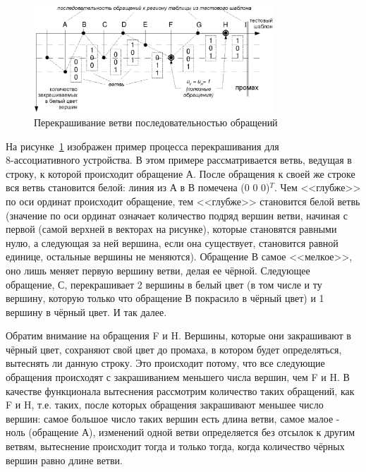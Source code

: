   \begin{figure}[h] \center
  \includegraphics[width=0.8\textwidth]{2.theor/plru_usefl_exmp}
  \caption{Перекрашивание ветви последовательностью обращений}\label{fig:plru_exmp_vytesn}
  \end{figure}

На рисунке~\ref{fig:plru_exmp_vytesn} изображен пример процесса перекрашивания для \\8-ассоциативного устройства. В этом примере рассматривается ветвь, ведущая в строку, к которой происходит обращение А. После обращения к своей же строке вся ветвь становится белой: линия из А в В помечена (0 0 0)$^T$. Чем <<глубже>> по оси ординат происходит обращение, тем <<глубже>> становится белой ветвь (значение по оси ординат означает количество подряд вершин ветви, начиная с первой (самой верхней в векторах на рисунке), которые становятся равными нулю, а следующая за ней вершина, если она существует, становится равной единице, остальные вершины не меняются). Обращение В самое <<мелкое>>, оно лишь меняет первую вершину ветви, делая ее чёрной. Следующее обращение, С, перекрашивает 2 вершины в белый цвет (в том числе и ту вершину, которую только что обращение В покрасило в чёрный цвет) и 1 вершину в чёрный цвет. И так далее.

Обратим внимание на обращения F и H. Вершины, которые они закрашивают в чёрный цвет, сохраняют свой цвет до промаха, в котором будет определяться, вытеснять ли данную строку. Это происходит потому, что все следующие обращения происходят с закрашиванием меньшего числа вершин, чем F и H. В качестве функционала вытеснения рассмотрим количество таких обращений, как F и H, т.е. таких, после которых обращения закрашивают меньшее число вершин: самое большое число таких вершин есть длина ветви, самое малое - ноль (обращение А), изменений одной ветви определяется без отсылок к другим ветвям, вытеснение происходит тогда и только тогда, когда количество чёрных вершин равно длине ветви.

%

